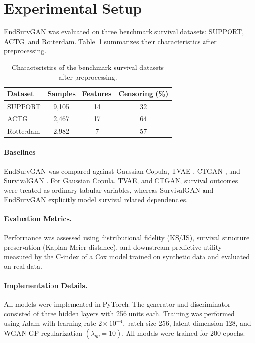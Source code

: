 \documentclass[twoside]{article}
\begin{document}
\section{Experimental Setup}
EndSurvGAN was evaluated on three benchmark survival datasets: SUPPORT, ACTG, and Rotterdam. Table~\ref{tab:dataset_characteristics} summarizes their characteristics after preprocessing.
\begin{table}[ht]
	\centering
	\caption{Characteristics of the benchmark survival datasets after preprocessing.}
	\label{tab:dataset_characteristics}
	\small
	\begin{tabular}{lccc}
		\hline
		Dataset & Samples & Features & Censoring (\%) \\
		\hline
		SUPPORT   & 9,105 & 14 & 32 \\
		ACTG      & 2,467 & 17 & 64 \\
		Rotterdam & 2,982 & 7  & 57 \\
		\hline
	\end{tabular}
\end{table}
\paragraph{Baselines}
EndSurvGAN was compared against Gaussian Copula, TVAE \cite{Xu2019}, CTGAN \cite{Xu2019}, and SurvivalGAN \cite{Norcliffe2023}. For Gaussian Copula, TVAE, and CTGAN, survival outcomes were treated as ordinary tabular variables, whereas SurvivalGAN and EndSurvGAN explicitly model survival related dependencies.
\paragraph{Evaluation Metrics.}
Performance was assessed using distributional fidelity (KS/JS), survival structure preservation (Kaplan Meier distance), and downstream predictive utility measured by the C-index of a Cox model trained on synthetic data and evaluated on real data.
\paragraph{Implementation Details.}
All models were implemented in PyTorch. The generator and discriminator consisted of three hidden layers with 256 units each. Training was performed using Adam with learning rate \(2\times10^{-4}\), batch size 256, latent dimension 128, and WGAN-GP regularization \((\lambda_{gp}=10)\). All models were trained for 200 epochs.
\end{document}
